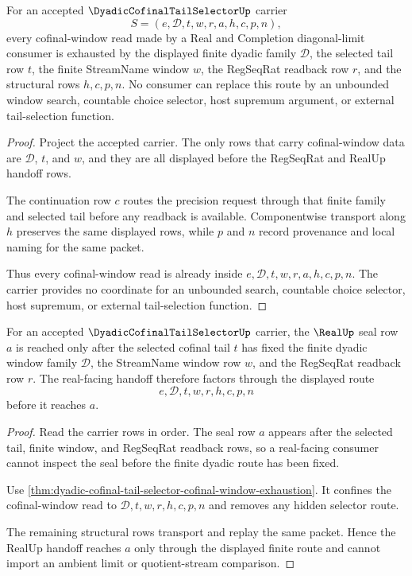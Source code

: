 \begin{theorem}
\label{thm:dyadic-cofinal-tail-selector-cofinal-window-exhaustion}
For an accepted $\DyadicCofinalTailSelectorUp$ carrier
$$
S=(e,\mathcal{D},t,w,r,a,h,c,p,n),
$$
every cofinal-window read made by a Real and Completion diagonal-limit consumer is exhausted by the displayed finite dyadic family $\mathcal{D}$, the selected tail row $t$, the finite StreamName window $w$, the RegSeqRat readback row $r$, and the structural rows $h,c,p,n$. No consumer can replace this route by an unbounded window search, countable choice selector, host supremum argument, or external tail-selection function.
\end{theorem}
\begin{proof}
Project the accepted carrier. The only rows that carry cofinal-window data are $\mathcal{D}$, $t$, and $w$, and they are all displayed before the RegSeqRat and RealUp handoff rows.

The continuation row $c$ routes the precision request through that finite family and selected tail before any readback is available. Componentwise transport along $h$ preserves the same displayed rows, while $p$ and $n$ record provenance and local naming for the same packet.

Thus every cofinal-window read is already inside $e,\mathcal{D},t,w,r,a,h,c,p,n$. The carrier provides no coordinate for an unbounded search, countable choice selector, host supremum, or external tail-selection function.
\end{proof}

\begin{theorem}
\label{thm:dyadic-cofinal-tail-selector-real-seal-handoff}
For an accepted $\DyadicCofinalTailSelectorUp$ carrier, the $\RealUp$ seal row $a$ is reached only after the selected cofinal tail $t$ has fixed the finite dyadic window family $\mathcal{D}$, the StreamName window row $w$, and the RegSeqRat readback row $r$. The real-facing handoff therefore factors through the displayed route
$$
e,\mathcal{D},t,w,r,h,c,p,n
$$
before it reaches $a$.
\end{theorem}
\begin{proof}
Read the carrier rows in order. The seal row $a$ appears after the selected tail, finite window, and RegSeqRat readback rows, so a real-facing consumer cannot inspect the seal before the finite dyadic route has been fixed.

Use \autoref{thm:dyadic-cofinal-tail-selector-cofinal-window-exhaustion}. It confines the cofinal-window read to $\mathcal{D},t,w,r,h,c,p,n$ and removes any hidden selector route.

The remaining structural rows transport and replay the same packet. Hence the RealUp handoff reaches $a$ only through the displayed finite route and cannot import an ambient limit or quotient-stream comparison.
\end{proof}

